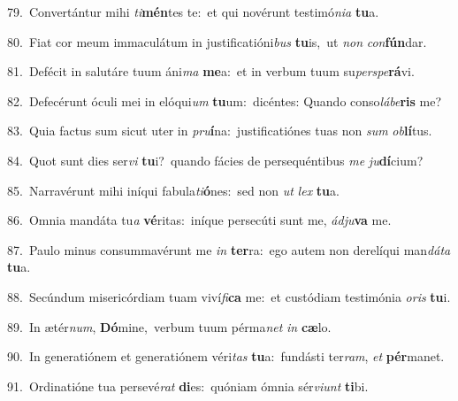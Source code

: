 {\numbfont\textcolor{\numbcolor}{79.}}~Convertántur mihi \textit{ti}\-\textbf{mén}tes te:~\star et qui novérunt testimó\-\textit{ni}\-\textit{a} \textbf{tu}\-a.\par
{\numbfont\textcolor{\numbcolor}{80.}}~Fiat cor meum immaculátum in justificatióni\textit{bus} \textbf{tu}\-is,~\star ut \textit{non} \textit{con}\-\textbf{fún}dar.\par
{\numbfont\textcolor{\numbcolor}{81.}}~Defécit in salutáre tuum áni\textit{ma} \textbf{me}\-a:~\star et in verbum tuum su\-\textit{per}\-\textit{spe}\textbf{rá}vi.\par
{\numbfont\textcolor{\numbcolor}{82.}}~Defecérunt óculi mei in elóqui\textit{um} \textbf{tu}\-um:~\star dicéntes: Quando conso\-\textit{lá}\-\textit{be}\textbf{ris} me?\par
{\numbfont\textcolor{\numbcolor}{83.}}~Quia factus sum sicut uter in \textit{pru}\-\textbf{í}na:~\star justificatiónes tuas non \textit{sum} \textit{ob}\-\textbf{lí}tus.\par
{\numbfont\textcolor{\numbcolor}{84.}}~Quot sunt dies ser\textit{vi} \textbf{tu}\-i?~\star quando fácies de persequéntibus \textit{me} \textit{ju}\-\textbf{dí}cium?\par
{\numbfont\textcolor{\numbcolor}{85.}}~Narravérunt mihi iníqui fabula\-\textit{ti}\-\textbf{ó}nes:~\star sed non \textit{ut} \textit{lex} \textbf{tu}\-a.\par
{\numbfont\textcolor{\numbcolor}{86.}}~Omnia mandáta tu\textit{a} \textbf{vé}\-ritas:~\star iníque persecúti sunt me, \textit{ád}\-\textit{ju}\textbf{va} me.\par
{\numbfont\textcolor{\numbcolor}{87.}}~Paulo minus consummavérunt me \textit{in} \textbf{ter}\-ra:~\star ego autem non derelíqui man\-\textit{dá}\-\textit{ta} \textbf{tu}\-a.\par
{\numbfont\textcolor{\numbcolor}{88.}}~Secúndum misericórdiam tuam viví\-\textit{fi}\-\textbf{ca} me:~\star et custódiam testimónia \textit{o}\-\textit{ris} \textbf{tu}\-i.\par
{\numbfont\textcolor{\numbcolor}{89.}}~In ætér\-\textit{num}\-, \textbf{Dó}\-mine,~\star verbum tuum pérma\textit{net} \textit{in} \textbf{cæ}\-lo.\par
{\numbfont\textcolor{\numbcolor}{90.}}~In generatiónem et generatiónem véri\textit{tas} \textbf{tu}\-a:~\star fundásti ter\-\textit{ram}\-, \textit{et} \textbf{pér}\-manet.\par
{\numbfont\textcolor{\numbcolor}{91.}}~Ordinatióne tua persevé\textit{rat} \textbf{di}\-es:~\star quóniam ómnia sér\-\textit{vi}\-\textit{unt} \textbf{ti}\-bi.\par
